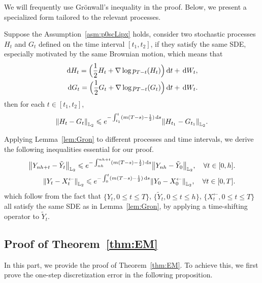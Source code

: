 We will frequently use Gr{\"o}nwall's inequality in the proof. 
Below, we present a specialized form tailored to the relevant processes.
\begin{lemma}
    \label{lem:Gron}
    Suppose the Assumption~\ref{asm:p0scLipx} holds, consider two stochastic processes $H_t$ and $G_t$ defined on the time interval $[t_1,t_2]$, if they satisfy the same SDE, especially motivated by the same Brownian motion, which means that
    \begin{align*}
        {\,\rm d} H_t=\Big(\dfrac{1}{2}H_t+\nabla\log p_{T-t}(H_t)\Big){\,\rm d} t+{\,\rm d} W_t,\\
        {\,\rm d} G_t=\Big(\dfrac{1}{2}G_t+\nabla\log p_{T-t}(G_t)\Big){\,\rm d} t+{\,\rm d} W_t.
    \end{align*}
    then for each $t\in[t_1,t_2]$, 
    \begin{align*}
        \l|H_t-G_t\r|_{\Ltwo}\leqslant e^{-\int_{t_1}^{t}(m(T-s)-\frac{1}{2})\rmd s}\l|H_{t_1}-G_{t_1}\r|_{\Ltwo}.
    \end{align*}
\end{lemma}
Applying Lemma~\ref{lem:Gron} to different processes and time intervals, we derive the following inequalities essential for our proof.
\begin{align}
    \l|Y_{nh+t}-\tilde{Y}_t\r|_{\Ltwo}\leqslant e^{-\int_{nh}^{nh+t}(m(T-s)-\frac{1}{2})\rmd s}\l|Y_{nh}-\tilde{Y}_0\r|_{\Ltwo},\quad\forall t\in[0,h].\label{eq:Gron1}\\
    \l|Y_t-X_t^{\leftarrow}\r|_{\Ltwo}\leqslant e^{-\int_0^{t}(m(T-s)-\frac{1}{2})\rmd s}\l|Y_0-X_0^{\leftarrow}\r|_{\Ltwo},\quad\forall t\in[0,T].\label{eq:Gron2}
\end{align}
which follow from the fact that $\{Y_t,0\leqslant t\leqslant T\}$, $\{\tilde{Y}_t,0\leqslant t\leqslant h\}$, $\{X_t^{\leftarrow},0\leqslant t\leqslant T\}$ all satisfy the same SDE as in Lemma~\ref{lem:Gron}, by applying a time-shifting operator to $\tilde{Y}_t$.\\

\subsection{Proof of Theorem~\ref{thm:EM}}
In this part, we provide the proof of Theorem~\ref{thm:EM}. To achieve this, we first prove the one-step discretization error in the following proposition.

